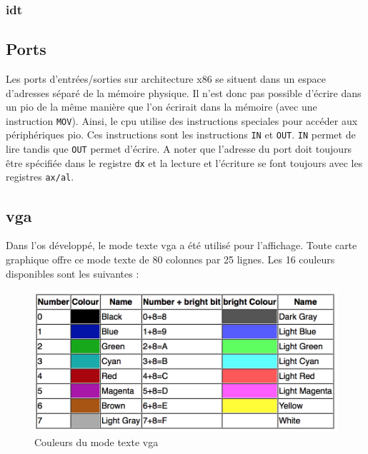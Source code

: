\documentclass[a4paper, 12pt]{article}
\begin{document}
\subsubsection{\acrshort{idt}}


\subsection{Ports}
Les ports d'entrées/sorties sur architecture x86 se situent dans un espace d'adresses
séparé de la mémoire physique. Il n'est donc pas possible d'écrire dans un \acrshort{pio}
de la même manière que l'on écrirait dans la mémoire (avec une instruction 
\texttt{MOV}). Ainsi, le \acrshort{cpu} utilise des instructions speciales
pour accéder aux périphériques \acrshort{pio}. Ces instructions sont les instructions
\texttt{IN} et \texttt{OUT}. \texttt{IN} permet de lire
tandis que \texttt{OUT} permet d'écrire. A noter que l'adresse du port
doit toujours être spécifiée dans le registre \texttt{dx} et la lecture
et l'écriture se font toujours avec les registres \texttt{ax/al}.\cite{ref42}


\subsection{\acrshort{vga}}
Dans l'\acrshort{os} développé, le mode texte \acrshort{vga} a été utilisé pour
l'affichage. Toute carte graphique offre ce mode texte de 80 colonnes par 25 lignes.
Les 16 couleurs disponibles sont les suivantes :\cite{ref19}
\begin{figure}[!h]
  \centering
  \includegraphics[scale=0.7]{images/colors.png}
  \caption{Couleurs du mode texte \acrshort{vga}}
\end{figure}
\end{document}
